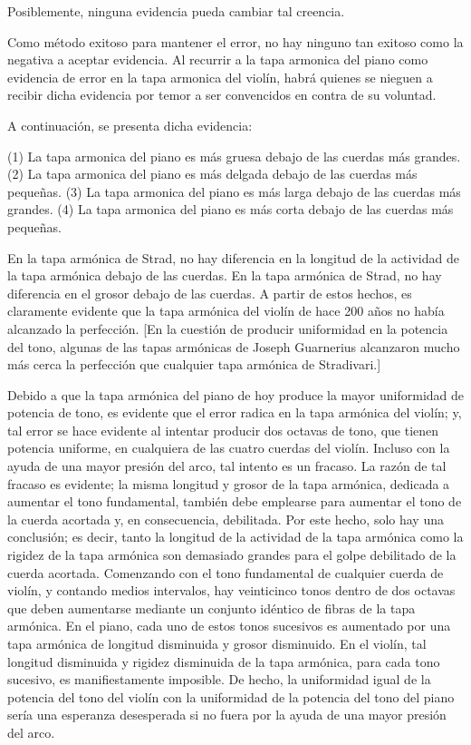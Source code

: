 \documentclass[12pt]{book}
\begin{document}
Posiblemente, ninguna evidencia pueda cambiar tal creencia.

Como método exitoso para mantener el error, no hay ninguno tan exitoso como la negativa a aceptar evidencia. Al recurrir a la tapa armonica del piano como evidencia de error en la tapa armonica del violín, habrá quienes se nieguen a recibir dicha evidencia por temor a ser convencidos en contra de su voluntad.

A continuación, se presenta dicha evidencia:

(1) La tapa armonica del piano es más gruesa debajo de las cuerdas más grandes.
(2) La tapa armonica del piano es más delgada debajo de las cuerdas más pequeñas.
(3) La tapa armonica del piano es más larga debajo de las cuerdas más grandes.
(4) La tapa armonica del piano es más corta debajo de las cuerdas más pequeñas.

En la tapa armónica de Strad, no hay diferencia en la longitud de la actividad de la tapa armónica debajo de las cuerdas. En la tapa armónica de Strad, no hay diferencia en el grosor debajo de las cuerdas. A partir de estos hechos, es claramente evidente que la tapa armónica del violín de hace 200 años no había alcanzado la perfección. [En la cuestión de producir uniformidad en la potencia del tono, algunas de las tapas armónicas de Joseph Guarnerius alcanzaron mucho más cerca la perfección que cualquier tapa armónica de Stradivari.]

Debido a que la tapa armónica del piano de hoy produce la mayor uniformidad de potencia de tono, es evidente que el error radica en la tapa armónica del violín; y, tal error se hace evidente al intentar producir dos octavas de tono, que tienen potencia uniforme, en cualquiera de las cuatro cuerdas del violín. Incluso con la ayuda de una mayor presión del arco, tal intento es un fracaso. La razón de tal fracaso es evidente; la misma longitud y grosor de la tapa armónica, dedicada a aumentar el tono fundamental, también debe emplearse para aumentar el tono de la cuerda acortada y, en consecuencia, debilitada. Por este hecho, solo hay una conclusión; es decir, tanto la longitud de la actividad de la tapa armónica como la rigidez de la tapa armónica son demasiado grandes para el golpe debilitado de la cuerda acortada. Comenzando con el tono fundamental de cualquier cuerda de violín, y contando medios intervalos, hay veinticinco tonos dentro de dos octavas que deben aumentarse mediante un conjunto idéntico de fibras de la tapa armónica. En el piano, cada uno de estos tonos sucesivos es aumentado por una tapa armónica de longitud disminuida y grosor disminuido. En el violín, tal longitud disminuida y rigidez disminuida de la tapa armónica, para cada tono sucesivo, es manifiestamente imposible. De hecho, la uniformidad igual de la potencia del tono del violín con la uniformidad de la potencia del tono del piano sería una esperanza desesperada si no fuera por la ayuda de una mayor presión del arco.
\end{document}
